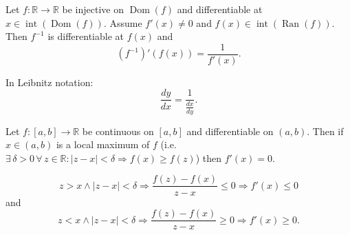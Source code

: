 \documentclass{notes}
\begin{document}
  \begin{lem}
    Let $f \colon \mathbb R \to \mathbb R$ be injective on $\operatorname{Dom}(f)$ and differentiable at $x \in \operatorname{int}(\operatorname{Dom}(f))$.
    Assume $f'(x) \neq 0$ and $f(x) \in \operatorname{int}(\operatorname{Ran}(f))$.
    Then $f^{-1}$ is differentiable at $f(x)$ and 
    \[
      (f^{-1})'(f(x)) = \frac{1}{f'(x)}.
    \]
    
    In Leibnitz notation: 
    \[
      \frac{dy}{dx} = \frac{1}{\frac{dx}{dy}}.
    \]
  \end{lem}
  
  \begin{lem}
    Let $f \colon [a, b] \to \mathbb R$ be continuous on $[a, b]$ and differentiable on $(a, b)$.
    Then if $x \in (a, b)$ is a local maximum of $f$ (i.e. $\exists \, \delta > 0 \, \forall \, z \in \mathbb R: \left | z - x \right | < \delta \Rightarrow f(x) \geq f(z)$) then $f'(x) = 0$.
  \end{lem}
  
  \begin{prf}
    \[
      z > x \land \left | z - x \right | < \delta \Rightarrow \frac{f(z) - f(x)}{z - x} \leq 0 \Rightarrow f'(x) \leq 0
    \]
    and 
    \[
      z < x \land \left | z - x \right | < \delta \Rightarrow \frac{f(z) - f(x)}{z - x} \geq 0 \Rightarrow f'(x) \geq 0.
    \]
  \end{prf}
\end{document}
